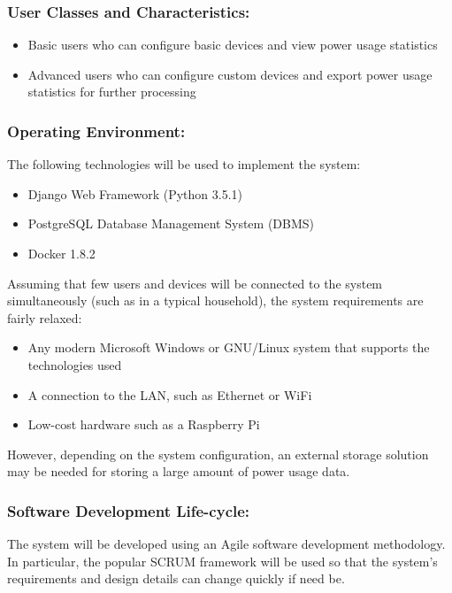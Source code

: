 \documentclass[10pt,twocolumn]{witseiepaper}
\begin{document}
	\subsubsection{User Classes and Characteristics:}
	\begin{itemize}
		\item Basic users who can configure basic devices and view power usage statistics
		\item Advanced users who can configure custom devices and export power usage statistics for further processing
	\end{itemize}
	
	\subsubsection{Operating Environment:}
	The following technologies will be used to implement the system:
	\begin{itemize}
		\item Django Web Framework (Python 3.5.1)
		\item PostgreSQL Database Management System (DBMS)
		\item Docker 1.8.2
	\end{itemize}
	Assuming that few users and devices will be connected to the system simultaneously (such as in a typical household), the system requirements are fairly relaxed:
	\begin{itemize}
		\item Any modern Microsoft Windows or GNU/Linux system that supports the technologies used
		\item A connection to the LAN, such as Ethernet or WiFi
		\item Low-cost hardware such as a Raspberry Pi
	\end{itemize}
	However, depending on the system configuration, an external storage solution may be needed for storing a large amount of power usage data.
	
	
	\subsubsection{Software Development Life-cycle:}
	The system will be developed using an Agile software development methodology. In particular, the popular SCRUM framework will be used so that the system's requirements and design details can change quickly if need be. 
	
\end{document}
